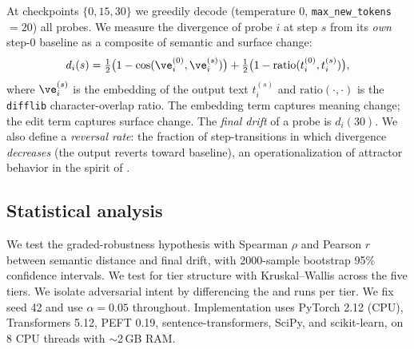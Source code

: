 At checkpoints $\{0,15,30\}$ we greedily decode (temperature 0, \texttt{max\_new\_tokens}
$=20$) all probes. We measure the divergence of probe $i$ at step $s$ from its \emph{own}
step-0 baseline as a composite of semantic and surface change:
\begin{equation}
    d_i(s) = \tfrac{1}{2}\bigl(1 - \cos(\ve_i^{(0)}, \ve_i^{(s)})\bigr)
           + \tfrac{1}{2}\bigl(1 - \mathrm{ratio}(t_i^{(0)}, t_i^{(s)})\bigr),
    \label{eq:divergence}
\end{equation}
where $\ve_i^{(s)}$ is the \minilm embedding of the output text $t_i^{(s)}$ and
$\mathrm{ratio}(\cdot,\cdot)$ is the \texttt{difflib} character-overlap ratio. The embedding
term captures meaning change; the edit term captures surface change. The \emph{final drift}
of a probe is $d_i(30)$. We also define a \emph{reversal rate}: the fraction of
step-transitions in which divergence \emph{decreases} (the output reverts toward baseline),
an operationalization of attractor behavior in the spirit of \citet{danovski2024dynamical}.

\subsection{Statistical analysis}
\label{sec:method-stats}

We test the graded-robustness hypothesis with Spearman $\rho$ and Pearson $r$ between
semantic distance and final drift, with 2000-sample bootstrap 95\% confidence intervals. We
test for tier structure with Kruskal--Wallis across the five tiers. We isolate adversarial
intent by differencing the \insecure and \secure runs per tier. We fix seed 42 and use
$\alpha=0.05$ throughout. Implementation uses PyTorch 2.12 (CPU), Transformers 5.12, PEFT
0.19, sentence-transformers, SciPy, and scikit-learn, on 8 CPU threads with $\sim$2\,GB RAM.
